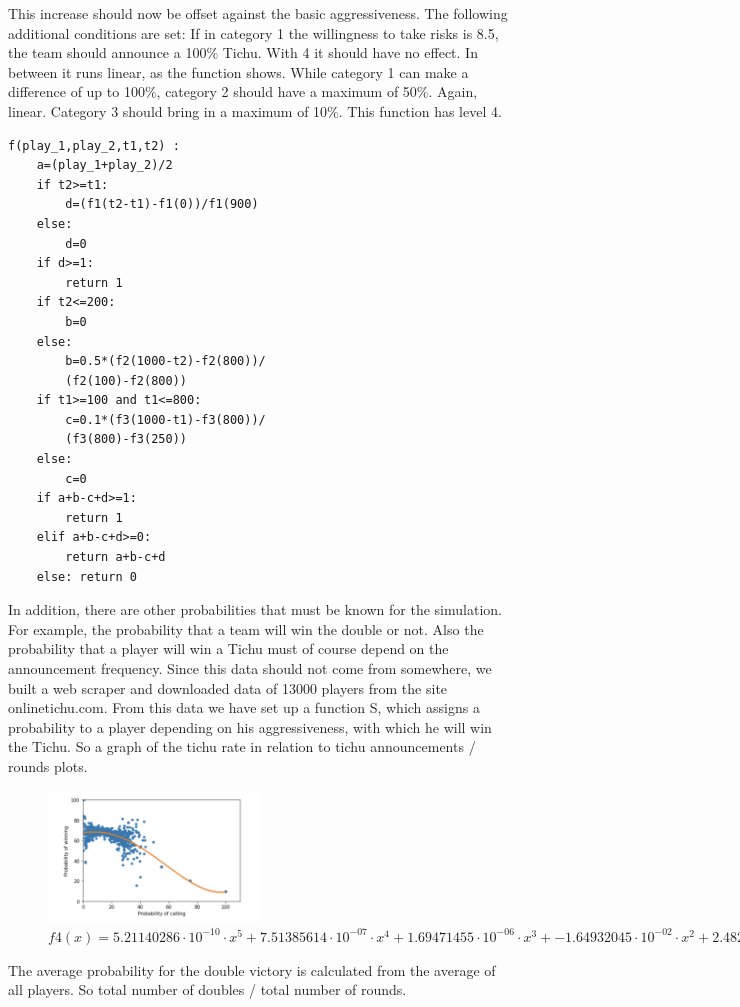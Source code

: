 This increase should now be offset against the basic aggressiveness.
The following additional conditions are set:
If in category 1 the willingness to take risks is 8.5, the team should announce a 100$\%$ Tichu. With 4 it should have no effect.  In between it runs linear, as the function shows.
While category 1 can make a difference of up to 100$\%$, category 2 should have a maximum of 50$\%$. Again, linear.
Category 3 should bring in a maximum of 10$\%$. This function has level 4.
\begin{lstlisting}
f(play_1,play_2,t1,t2) :
    a=(play_1+play_2)/2
    if t2>=t1:
        d=(f1(t2-t1)-f1(0))/f1(900)
    else: 
        d=0
    if d>=1:
        return 1
    if t2<=200:
        b=0
    else:
        b=0.5*(f2(1000-t2)-f2(800))/
        (f2(100)-f2(800))
    if t1>=100 and t1<=800:
        c=0.1*(f3(1000-t1)-f3(800))/
        (f3(800)-f3(250))
    else:
        c=0
    if a+b-c+d>=1:
        return 1
    elif a+b-c+d>=0:
        return a+b-c+d
    else: return 0
\end{lstlisting}


In addition, there are other probabilities that must be known for the simulation. For example, the probability that a team will win the double or not. Also the probability that a player will win a Tichu must of course depend on the announcement frequency. 
Since this data should not come from somewhere, we built a web scraper and downloaded data of 13000 players from the site onlinetichu.com. From this data we have set up a function S, which assigns a probability to a player depending on his aggressiveness, with which he will win the Tichu.
So a graph of the tichu rate in relation to tichu announcements / rounds plots.
\begin{figure}[h]
    \centering
    \includegraphics[width=0.5\textwidth]{Bilder/calling_winning_graph}
    \caption{$f4(x)=5.21140286\cdot 10^{-10}\cdot x^5+  7.51385614\cdot 10^{-07}\cdot x^4+  1.69471455\cdot 10^{-06}\cdot x^3+ -1.64932045\cdot 10^{-02}\cdot x^2+2.48230296\cdot 10^{-01}\cdot x + 67.7185027$}
    \label{fig:meine-grafik}
\end{figure}
The average probability for the double victory is calculated from the average of all players. So total number of doubles / total number of rounds.
